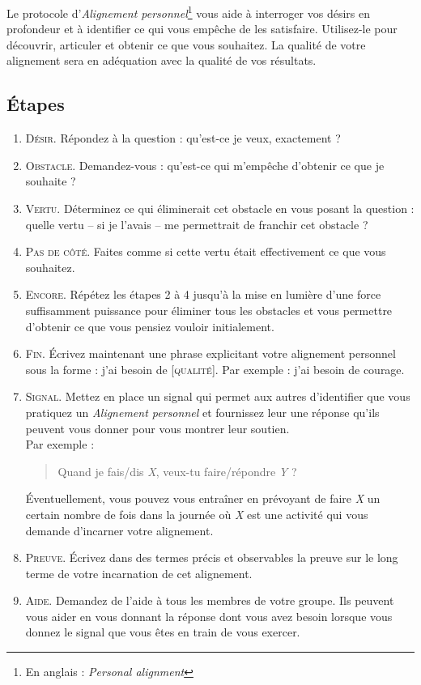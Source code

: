 \documentclass[paper=6in:9in,pagesize=pdftex,headinclude=on,footinclude=on,12pt]{scrbook}
\begin{document}
Le protocole d'\emph{Alignement personnel}\footnote{En anglais : \emph{Personal alignment}} vous aide à interroger vos désirs en profondeur et à
identifier ce qui vous empêche de les satisfaire. Utilisez-le pour découvrir, articuler et obtenir ce que vous souhaitez. La qualité de votre
alignement sera en adéquation avec la qualité de vos résultats.

\subsection{Étapes}
\begin{enumerate}
	\item \textsc{Désir.} Répondez à la question : \og{}qu'est-ce je veux, exactement ?\fg{}
	\item \textsc{Obstacle.} Demandez-vous : \og{}qu'est-ce qui m'empêche d'obtenir ce que je souhaite ?\fg{}
	\item \textsc{Vertu.} Déterminez ce qui éliminerait cet obstacle en vous posant la question : \og{}quelle vertu -- si je
	      l'avais -- me permettrait de franchir cet obstacle ?\fg{}
	\item \textsc{Pas de côté.} Faites comme si cette vertu était effectivement ce que vous souhaitez.
	\item \textsc{Encore.} Répétez les étapes 2 à 4 jusqu'à la mise en lumière d'une force suffisamment puissance pour éliminer tous les obstacles et vous permettre
	      d'obtenir ce que vous pensiez vouloir initialement.
	\item \textsc{Fin.} Écrivez maintenant une phrase explicitant votre alignement personnel sous la forme : \og{}j'ai besoin de [\textsc{qualité}]\fg{}.
	      Par exemple : \og{}j'ai besoin de courage\fg{}.
	\item \textsc{Signal.} Mettez en place un signal qui permet aux autres d'identifier que vous pratiquez un \emph{Alignement personnel}
	      et fournissez leur une réponse qu'ils peuvent vous donner pour vous montrer leur soutien.\\
		Par exemple :
	      \begin{quote}
	      	\og{}Quand je fais/dis \emph{X}, veux-tu faire/répondre \emph{Y} ?\fg{}
	      \end{quote}
	      Éventuellement, vous pouvez vous entraîner en prévoyant de faire \emph{X} un certain nombre de fois dans la journée où \emph{X} est une activité
	      qui vous demande d'incarner votre alignement.
	\item \textsc{Preuve.} Écrivez dans des termes précis et observables la preuve sur le long terme de votre incarnation de cet alignement.
	\item \textsc{Aide.} Demandez de l'aide à tous les membres de votre groupe. Ils peuvent vous aider en vous donnant la réponse dont vous avez besoin lorsque
	      vous donnez le signal que vous êtes en train de vous exercer.
\end{enumerate}
\end{document}
